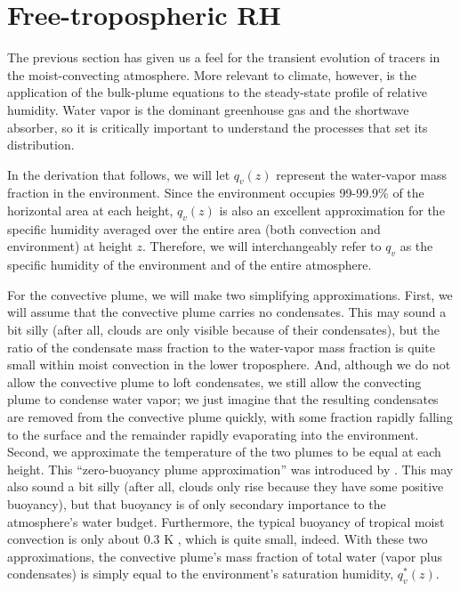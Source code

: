 \documentclass[12pt]{article}
\begin{document}
\section{Free-tropospheric RH}


The previous section has given us a feel for the transient evolution of tracers in the moist-convecting atmosphere.  More relevant to climate, however, is the application of the bulk-plume equations to the steady-state profile of relative humidity.  Water vapor is the dominant greenhouse gas and the shortwave absorber, so it is critically important to understand the processes that set its distribution.


In the derivation that follows, we will let $q_v(z)$ represent the water-vapor mass fraction in the environment.  Since the environment occupies 99-99.9\% of the horizontal area at each height, $q_v(z)$ is also an excellent approximation for the specific humidity averaged over the entire area (both convection and environment) at height $z$.  Therefore, we will interchangeably refer to $q_v$ as the specific humidity of the environment and of the entire atmosphere.


For the convective plume, we will make two simplifying approximations.  First, we will assume that the convective plume carries no condensates.  This may sound a bit silly (after all, clouds are only visible because of their condensates), but the ratio of the condensate mass fraction to the water-vapor mass fraction is quite small within moist convection in the lower troposphere.  And, although we do not allow the convective plume to loft condensates, we still allow the convecting plume to condense water vapor; we just imagine that the resulting condensates are removed from the convective plume quickly, with some fraction rapidly falling to the surface and the remainder rapidly evaporating into the environment.  Second, we approximate the temperature of the two plumes to be equal at each height.  This ``zero-buoyancy plume approximation'' was introduced by \citet{singh2013}.  This may also sound a bit silly (after all, clouds only rise because they have some positive buoyancy), but that buoyancy is of only secondary importance to the atmosphere's water budget.  Furthermore, the typical buoyancy of tropical moist convection is only about 0.3 K \citep{13stereo}, which is quite small, indeed.  With these two approximations, the convective plume's mass fraction of total water (vapor plus condensates) is simply equal to the environment's saturation humidity, $q_v^*(z)$.
\end{document}
